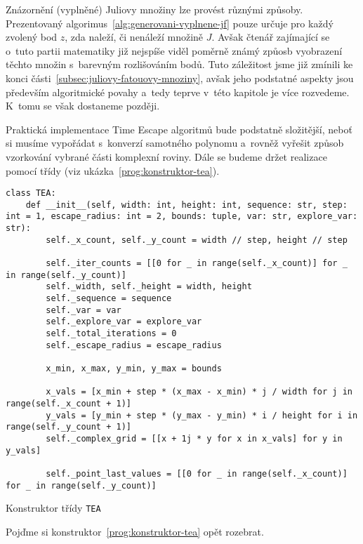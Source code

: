 Znázornění (vyplněné) Juliovy množiny lze provést různými způsoby. Prezentovaný algorimus~\ref{alg:generovani-vyplnene-jf} pouze určuje pro každý zvolený bod $z$, zda naleží, či nenáleží množině $J$. Avšak čtenář zajímající se o~tuto partii matematiky již nejspíše viděl poměrně známý způosb vyobrazení těchto množin s~barevným rozlišováním bodů. Tuto záležitost jsme již zmínili ke konci části~\ref{subsec:juliovy-fatouovy-mnoziny}, avšak jeho podstatné aspekty jsou především algoritmické povahy a~tedy teprve v~této kapitole je více rozvedeme. K~tomu se však dostaneme později.

Praktická implementace Time Escape algoritmů bude podstatně složitější, neboť si musíme vypořádat s~konverzí samotného polynomu a~rovněž vyřešit způsob vzorkování vybrané části komplexní roviny. Dále se budeme držet realizace pomocí třídy (viz ukázka~\ref{prog:konstruktor-tea}).
\begin{program}[h]
\begin{lstlisting}[style=python]
class TEA:
    def __init__(self, width: int, height: int, sequence: str, step: int = 1, escape_radius: int = 2, bounds: tuple, var: str, explore_var: str):
        self._x_count, self._y_count = width // step, height // step
        
        self._iter_counts = [[0 for _ in range(self._x_count)] for _ in range(self._y_count)]
        self._width, self._height = width, height
        self._sequence = sequence
        self._var = var
        self._explore_var = explore_var
        self._total_iterations = 0
        self._escape_radius = escape_radius

        x_min, x_max, y_min, y_max = bounds

        x_vals = [x_min + step * (x_max - x_min) * j / width for j in range(self._x_count + 1)]
        y_vals = [y_min + step * (y_max - y_min) * i / height for i in range(self._y_count + 1)]
        self._complex_grid = [[x + 1j * y for x in x_vals] for y in y_vals]

        self._point_last_values = [[0 for _ in range(self._x_count)] for _ in range(self._y_count)]
\end{lstlisting}
    \caption{Konstruktor třídy \texttt{TEA}}
    \label{prog:konstruktor-tea}
\end{program}
Pojďme si konstruktor~\ref{prog:konstruktor-tea} opět rozebrat.
